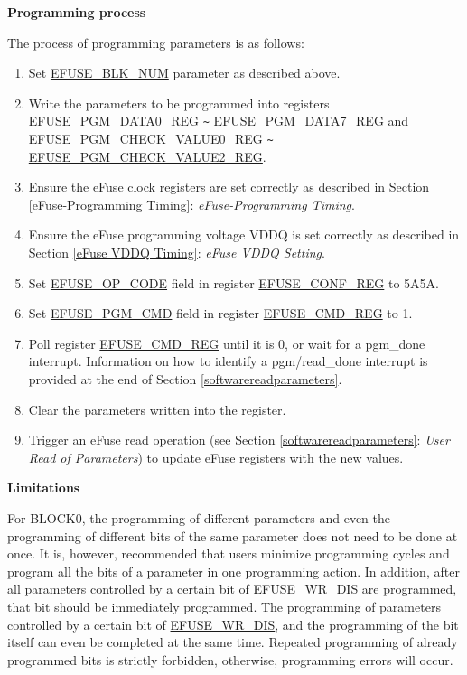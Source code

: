 \documentclass[main\_\_EN.tex]{subfiles}
\begin{document}
{\bfseries Programming process}

The process of programming parameters is as follows:

\begin{enumerate}
\item Set \hyperref[fielddesc:EFUSEBLKNUM]{EFUSE\_BLK\_NUM} parameter as described above.

\item Write the parameters to be programmed into registers \hyperref[regdesc:EFUSEPGMDATANREG]{EFUSE\_PGM\_DATA0\_REG} \verb+~+ \hyperref[regdesc:EFUSEPGMDATANREG]{EFUSE\_PGM\_DATA7\_REG} and \hyperref[regdesc:EFUSEPGMCHECKVALUENREG]{EFUSE\_PGM\_CHECK\_VALUE0\_REG} \verb+~+ \hyperref[regdesc:EFUSEPGMCHECKVALUENREG]{EFUSE\_PGM\_CHECK\_VALUE2\_REG}.

\item Ensure the eFuse clock registers are set correctly as described in Section \ref{eFuse-Programming Timing}: \textit{eFuse-Programming Timing}.

\item Ensure the eFuse programming voltage VDDQ is set correctly as described in Section \ref{eFuse VDDQ Timing}: \textit{eFuse VDDQ Setting}.

\item Set \hyperref[fielddesc:EFUSEOPCODE]{EFUSE\_OP\_CODE} field in register \hyperref[regdesc:EFUSECONFREG]{EFUSE\_CONF\_REG} to \hexprefix{}5A5A.

\item Set \hyperref[fielddesc:EFUSEPGMCMD]{EFUSE\_PGM\_CMD} field in register \hyperref[regdesc:EFUSECMDREG]{EFUSE\_CMD\_REG} to 1.

\item Poll register \hyperref[regdesc:EFUSECMDREG]{EFUSE\_CMD\_REG} until it is \hexprefix{}0, or wait for a pgm\_done interrupt. Information on how to identify a pgm/read\_done interrupt is provided at the end of Section \ref{softwarereadparameters}.

\item Clear the parameters written into the register.

\item Trigger an eFuse read operation (see Section \ref{softwarereadparameters}: \textit{User Read of Parameters}) to update eFuse registers with the new values.
\end{enumerate}

{\bfseries Limitations}

For BLOCK0, the programming of different parameters and even the programming of different bits of the same parameter does not need to be done at once. It is, however, recommended that users minimize programming cycles
and program all the bits of a parameter in one programming action. In addition, after all parameters controlled by a certain bit of \hyperref[fielddesc:EFUSEWRDIS]{EFUSE\_WR\_DIS} are programmed, that bit should be immediately programmed. The programming of parameters controlled by a certain bit of \hyperref[fielddesc:EFUSEWRDIS]{EFUSE\_WR\_DIS},
and the programming of the bit itself can even be completed at the same time. Repeated programming of already programmed bits is strictly forbidden, otherwise, programming errors will occur.
\end{document}
